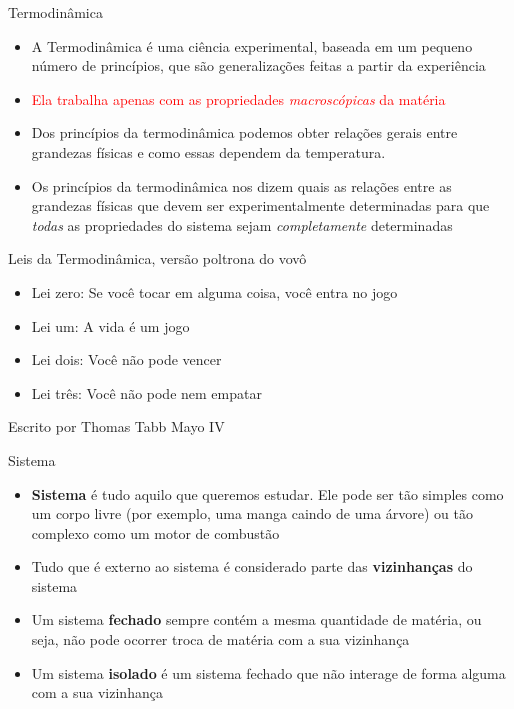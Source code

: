 \documentclass[t,%
brazilian,%
11pt,%
aspectratio=169,%
table%
]{beamer}
\begin{document}
\begin{frame}{Termodinâmica}
    \begin{itemize}
        \item A Termodinâmica é uma ciência experimental, baseada em um pequeno
            número de princípios, que são generalizações feitas a partir da
            experiência
        \item \textcolor{red}{Ela trabalha apenas com as propriedades \textit{macroscópicas} da
            matéria}
        \item Dos princípios da termodinâmica podemos obter relações gerais
            entre grandezas físicas e como essas dependem da temperatura.
        \item Os princípios da termodinâmica nos dizem quais as relações entre as 
            grandezas físicas que devem ser experimentalmente determinadas para que 
            \textit{todas} as propriedades do sistema sejam \textit{completamente} determinadas
    \end{itemize}
\end{frame}

\begin{frame}[c]{Leis da Termodinâmica, versão poltrona do vovô}
    \begin{itemize}
        \item Lei zero: Se você tocar em alguma coisa, você entra no jogo
        \item Lei um: A vida é um jogo
        \item Lei dois: Você não pode vencer
        \item Lei três: Você não pode nem empatar
    \end{itemize}

    \vspace{1cm}
    Escrito por Thomas Tabb Mayo IV
\end{frame}


\begin{frame}{Sistema}
    \begin{itemize}
        \item \textbf{Sistema} é tudo aquilo que queremos estudar. Ele pode ser tão simples 
            como um corpo livre (por exemplo, uma manga caindo de uma árvore) ou tão complexo como
            um motor de combustão
        \item Tudo que é externo ao sistema é considerado parte das \textbf{vizinhanças} do sistema
        \item Um sistema \textbf{fechado} sempre contém a mesma quantidade de matéria, ou seja, 
            não pode ocorrer troca de matéria com a sua vizinhança
        \item Um sistema \textbf{isolado} é um sistema fechado que não interage de forma alguma
            com a sua vizinhança
    \end{itemize}
\end{frame}
\end{document}
